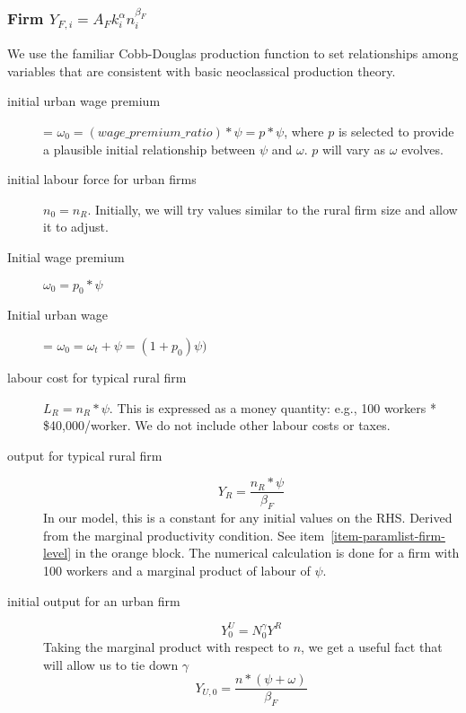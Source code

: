 \subsubsection{Firm $Y_{F,i}=A_Fk_i^\alpha n_i^{\beta_F}$}
We use the familiar Cobb-Douglas production function \cite{chiangFundamentalMethodsMathematical2002} to set relationships among variables that are consistent with basic neoclassical production theory. 
\begin{description}

\item[initial urban wage premium] = $\omega_0 = (wage\_premium\_ratio) * \psi = p*\psi $, where $p$ is selected to provide a plausible initial relationship between $\psi$ and $\omega$. $p$ will vary as $\omega$ evolves. 

\item[initial labour force for urban firms] $n_0=n_R$.  Initially, we will try values similar to the rural firm size and allow it to adjust.  %

\item[Initial wage premium] $\omega_0=p_0*\psi$

\item[Initial urban wage] = $\omega_0=\omega_t +\psi =(1+p_0)\psi)$

\item[labour cost for typical rural firm] $L_R = n_R*\psi$. This is expressed as a money quantity: e.g., 100 workers * \$40,000/worker. We do not include other labour costs or taxes. 


\item[output for typical rural firm]  
\[Y_R=\frac{n_R*\psi}{\beta_F}\]
In our model, this is a constant for any initial values on the RHS. Derived from the marginal productivity condition. See item~\ref{item-paramlist-firm-level} in the orange  block. The numerical calculation is done  for a firm with 100 workers and a marginal product of labour of $\psi$. %


\item[initial output for an urban firm] 
\[Y_0^U=N_0^\gamma Y^R\]  
Taking the marginal product with respect to $n$, we get a useful fact that will allow us to tie down $\gamma$
\[Y_{U,0}=\frac{n*(\psi+\omega)}{\beta_F}\]


\end{description}
